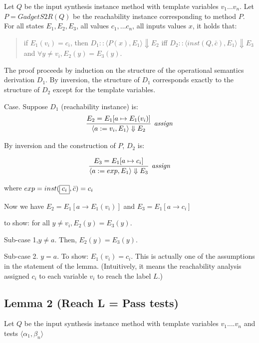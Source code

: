 \documentclass[11pt]{article}
\begin{document}
Let $Q$ be the input synthesis instance method with template variables $v_1 \ldots
v_n$.  Let $P = GadgetS2R(Q)$ be the reachability instance corresponding to method
$P$.  For all states $E_1, E_2, E_3$, all values $c_1, \ldots
c_n$, all inputs values $x$, it holds that:

\begin{quote}
  if $E_1(v_i) = c_i$, then $D_1:: \langle P(x), E_1\rangle \Downarrow E_2$ iff
$D_2:: \langle inst(Q,\bar{c}), E_1 \rangle \Downarrow E_3$ and $\forall y \neq v_i,
E_2(y) = E_3(y)$.
\end{quote}

The proof proceeds by induction on the structure of the operational semantics
derivation $D_1$. By inversion, the structure of $D_1$ corresponds exactly to the
structure of $D_2$ except for the template variables.

Case.  Suppose $D_1$ (reachability instance) is:
\[
\begin{array}{c}

\infer[\textit{assign}]
{ \langle a := v_i, E_1 \rangle \Downarrow E_2} {E_2 = E_1 [ a
  \mapsto E_1(v_i)] }
\end{array}
\]

By inversion and the construction of $P$, $D_2$ is:

\[
\begin{array}{c}

\infer[\textit{assign}]
{ \langle a := exp, E_1 \rangle \Downarrow E_3} {E_3 = E_1 [ a
  \mapsto c_i] }
\end{array}
\]

where $exp = inst(\fbox{$\displaystyle c_i $}, \bar{c}) = c_i$

Now we have $E_2 = E_1 [ a \rightarrow E_1(v_i) ]$
and $E_3 = E_1 [ a \rightarrow c_i ]$

to show: for all $y \neq v_i, E_2(y) = E_3(y). $

Sub-case 1,$y \neq a. $ Then, $E_2(y)  = E_3(y)$.  

Sub-case 2.  $y = a$.  To show: $E_1  (v_i) = c_i.$  This is actually one of
the assumptions in the statement of the lemma.  (Intuitively, it means the
reachability analysis assigned $c_i$ to each variable $v_i$ to reach the label $L$.) 


\subsection{Lemma 2 (Reach L = Pass tests)}


Let $Q$ be the input synthesis instance method with template variables $v_1
\ldots. v_n$ and tests $\langle\alpha_1, \beta_n\rangle$
\end{document}
